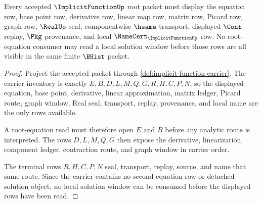 \begin{theorem}
\label{thm:implicit-function-root-equation-carrier}
Every accepted $\ImplicitFunctionUp$ root packet must display the equation row, base point row, derivative row, linear map row, matrix row, Picard row, graph row, $\RealUp$ seal, componentwise $\hsame$ transport, displayed $\Cont$ replay, $\Pkg$ provenance, and local $\NameCert_{\ImplicitFunctionUp}$ row. No root-equation consumer may read a local solution window before those rows are all visible in the same finite $\BHist$ packet.
\end{theorem}
\begin{proof}
Project the accepted packet through \autoref{def:implicit-function-carrier}. The carrier inventory is exactly $E,B,D,L,M,Q,G,R,H,C,P,N$, so the displayed equation, base point, derivative, linear approximation, matrix ledger, Picard route, graph window, Real seal, transport, replay, provenance, and local name are the only rows available.

A root-equation read must therefore open $E$ and $B$ before any analytic route is interpreted. The rows $D,L,M,Q,G$ then expose the derivative, linearization, component ledger, contraction route, and graph window in carrier order.

The terminal rows $R,H,C,P,N$ seal, transport, replay, source, and name that same route. Since the carrier contains no second equation row or detached solution object, no local solution window can be consumed before the displayed rows have been read.
\end{proof}

